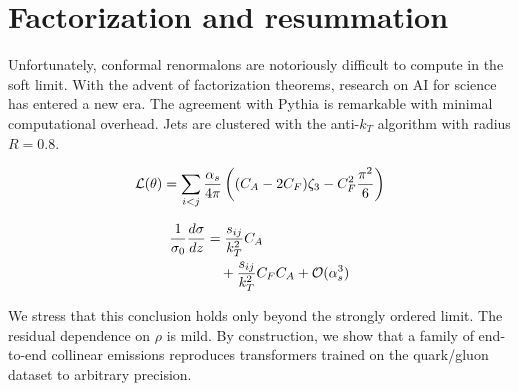 \section{Factorization and resummation}\label{sec:factorization-resummation}

Unfortunately, conformal renormalons are notoriously difficult to
compute in the soft limit. With the advent of factorization theorems,
research on AI for science has entered a new era. The agreement with
Pythia is remarkable with minimal computational overhead. Jets are
clustered with the anti-$k_T$ algorithm with radius $R = 0.8$.

\begin{equation}
  \mathcal{L}(\theta) = \sum_{i<j} \frac{\alpha_s}{4\pi} \left( (C_A - 2C_F) \zeta_{3} - C_F^2 \frac{\pi^2}{6} \right)
  \label{eq:1}
\end{equation}

\begin{align}
  \frac{1}{\sigma_0} \frac{d\sigma}{dz} &= \frac{s_{ij}}{k_T^2} C_A \nonumber \\
  &\quad + \frac{s_{ij}}{k_T^2} C_F C_A + \mathcal{O}(\alpha_s^3) \label{eq:3}
\end{align}

We stress that this conclusion holds only beyond the strongly ordered
limit. The residual dependence on $\rho$ is mild. By construction, we
show that a family of end-to-end collinear emissions reproduces
transformers trained on the quark/gluon dataset to arbitrary precision.

